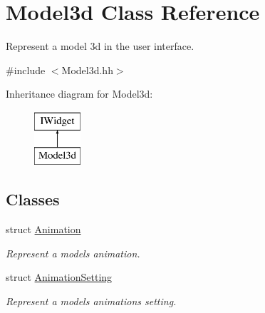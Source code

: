\hypertarget{classModel3d}{}\section{Model3d Class Reference}
\label{classModel3d}


Represent a model 3d in the user interface.  




{\ttfamily \#include $<$Model3d.\+hh$>$}

Inheritance diagram for Model3d\+:\begin{figure}[H]
\begin{center}
\leavevmode
\includegraphics[height=2.000000cm]{classModel3d}
\end{center}
\end{figure}
\subsection*{Classes}
\begin{DoxyCompactItemize}
\item 
struct \hyperlink{structModel3d_1_1Animation}{Animation}
\begin{DoxyCompactList}\small\item\em Represent a model\textquotesingle{}s animation. \end{DoxyCompactList}\item 
struct \hyperlink{structModel3d_1_1AnimationSetting}{Animation\+Setting}
\begin{DoxyCompactList}\small\item\em Represent a model\textquotesingle{}s animation\textquotesingle{}s setting. \end{DoxyCompactList}\end{DoxyCompactItemize}
